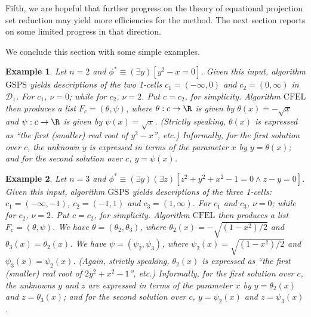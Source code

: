 \documentclass{article}
\newtheorem{example}{Example}
\begin{document}
Fifth, we are hopeful that further progress on the theory of equational 
projection set reduction may yield more efficiencies for the method. The 
next section reports on some limited progress in that direction.

We conclude this section with some simple examples.

\begin{example}
    Let $n = 2$ and $\phi^* \equiv (\exists y)[y^2 - x = 0]$.
    Given this input, algorithm $\mathrm{GSPS}$ yields descriptions
    of the two 1-cells $c_1 = (-\infty, 0)$ and $c_2 = (0, \infty)$
    in $\mathcal{D}_1$. For $c_1$, $\nu = 0$; while for $c_2$,
    $\nu = 2$. Put $c = c_2$, for simplicity.
     Algorithm $\mathrm{CFEL}$ then produces a list $F_c = (\theta, \psi)$,
     where $\theta : c \rightarrow \R$ is given by
     $\theta(x) = -\sqrt{x}$ and $\psi : c \rightarrow \R$
     is given by $\psi(x) = \sqrt{x}$.
     (Strictly speaking, $\theta(x)$ is expressed as 
     ``the first (smaller) real root of $y^2 - x$'', etc.)
     Informally, for the first solution over $c$,
     the unknown $y$ is expressed in terms of the parameter $x$ by
     $y = \theta(x)$; and for the second solution over $c$,
     $y = \psi(x)$.
\end{example}

\begin{example}
    Let $n = 3$ and 
    $\phi^* \equiv 
    (\exists y)(\exists z)[z^2 + y^2 + x^2 - 1 = 0 \wedge z - y = 0]$.
    Given this input, algorithm $\mathrm{GSPS}$ yields descriptions
    of the three 1-cells:\\ $c_1 = (-\infty, -1)$,
    $c_2 = (-1, 1)$ and $c_3 = (1, \infty)$.
    For $c_1$ and $c_3$, $\nu = 0$; while for $c_2$, $\nu = 2$.
    Put $c = c_2$, for simplicity.
    Algorithm $\mathrm{CFEL}$ then produces a list
    $F_c = (\theta, \psi)$.
    We have $\theta = (\theta_2, \theta_3)$, where
    $\theta_2(x) = -\sqrt{(1 - x^2)/2}$ and
    $\theta_3(x) = \theta_2(x)$.
    We have $\psi = (\psi_2, \psi_3)$, where
    $\psi_2(x) = \sqrt{(1 - x^2)/2}$ and
    $\psi_3(x) = \psi_2(x)$.
    (Again, strictly speaking, $\theta_2(x)$ is expressed as
    ``the first (smaller) real root of $2y^2 + x^2 - 1$'', etc.)
    Informally, for the first solution over $c$, the unknowns $y$
    and $z$ are expressed in terms of the parameter $x$ by
    $y = \theta_2(x)$ and $z = \theta_3(x)$; 
    and for the second solution over $c$,
    $y = \psi_2(x)$ and $z = \psi_3(x)$.
\end{example}
\end{document}
